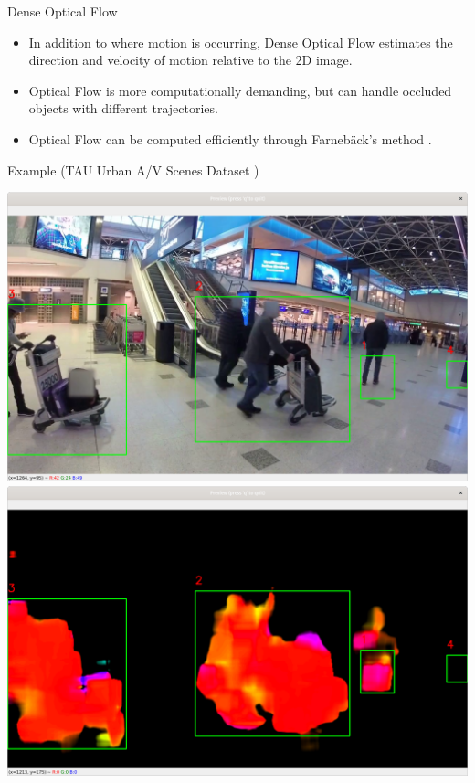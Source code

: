 \documentclass[10pt]{beamer}
\begin{document}
\begin{frame}{Dense Optical Flow}

\begin{itemize}
\item In addition to where motion is occurring, Dense Optical Flow estimates the \alert{direction and velocity} of motion relative to the 2D image.

\item Optical Flow is more computationally demanding, but can handle occluded objects with different trajectories.

\item Optical Flow can be computed efficiently through \alert{Farneb\"ack's method} \cite{farnemack}.\\[4mm]
\end{itemize}

\begin{exampleblock}{Example (TAU Urban A/V Scenes Dataset \cite{wang_curated_2021})}
\begin{center}
\includegraphics[scale=0.1]{figures/helsinki_optflow}\includegraphics[scale=0.1]{figures/helsinki_optflow_filtered}
\end{center}
\end{exampleblock}

\end{frame}
\end{document}
